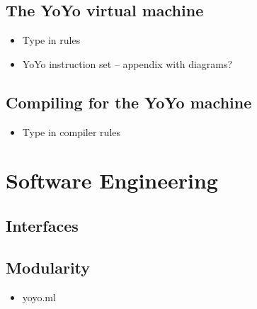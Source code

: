 \documentclass[class=article, crop=false]{standalone}
\begin{document}
\subsection{The YoYo virtual machine}

\begin{itemize}
    \item Type in rules
    \item YoYo instruction set -- appendix with diagrams?
\end{itemize}

\subsection{Compiling for the YoYo machine}

\begin{itemize}
    \item Type in compiler rules
\end{itemize}

\section{Software Engineering}

\subsection{Interfaces}
\subsection{Modularity}
\begin{itemize}
    \item yoyo.ml
\end{itemize}
\end{document}
